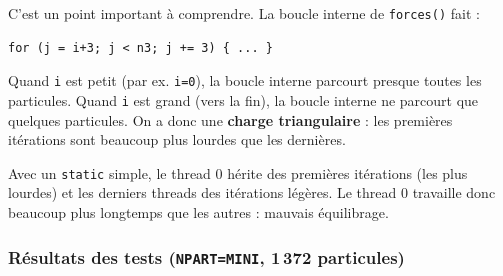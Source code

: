 \documentclass[12pt,a4paper]{article}
\begin{document}
C'est un point important à comprendre. La boucle interne de \texttt{forces()} fait :

\begin{lstlisting}
for (j = i+3; j < n3; j += 3) { ... }
\end{lstlisting}

Quand \texttt{i} est petit (par ex. \texttt{i=0}), la boucle interne parcourt presque toutes les particules. Quand \texttt{i} est grand (vers la fin), la boucle interne ne parcourt que quelques particules. On a donc une \textbf{\textcolor{warnborder}{charge triangulaire}} : les premières itérations sont beaucoup plus lourdes que les dernières.

Avec un \texttt{static} simple, le thread 0 hérite des premières itérations (les plus lourdes) et les derniers threads des itérations légères. Le thread 0 travaille donc beaucoup plus longtemps que les autres : mauvais équilibrage.

\subsubsection{Résultats des tests (\texttt{NPART=MINI}, 1\,372 particules)}
\end{document}
